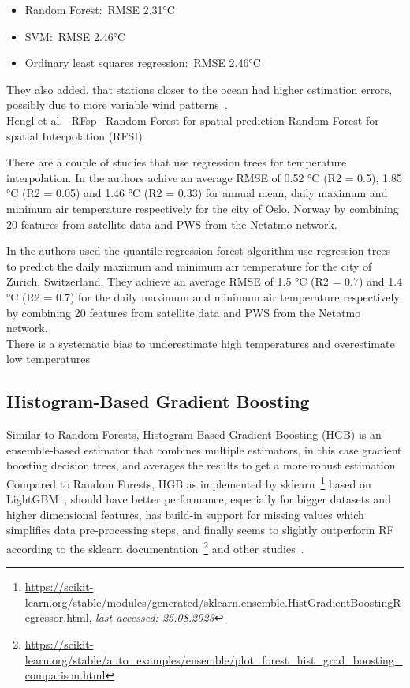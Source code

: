 \begin{itemize}
    \item Random Forest:\ RMSE 2.31°C
    \item SVM:\ RMSE 2.46°C
    \item Ordinary least squares regression:\ RMSE 2.46°C
\end{itemize}

They also added, that stations closer to the ocean had higher estimation errors, possibly due to more variable wind patterns~\cite{runnalls2000dynamics}.\\
Hengl et al.~\cite{hengl2018random}
RFsp~\cite{hengl2018random} Random Forest for spatial prediction
Random Forest for spatial Interpolation (RFSI)~\cite{sekulic2020random}

There are a couple of studies that use regression trees for temperature interpolation. In \cite{venter2020hyperlocal} the authors achive an average RMSE of 0.52 °C (R2 = 0.5), 1.85 °C (R2 = 0.05) and 1.46 °C (R2 = 0.33) for annual mean, daily maximum and minimum air temperature respectively for the city of Oslo, Norway by combining 20 features from satellite data and PWS from the Netatmo network.

In \cite{zumwald2021mapping} the authors used the quantile regression forest algorithm
use regression trees to predict the daily maximum and minimum air temperature for the city of Zurich, Switzerland. They achieve an average RMSE of 1.5 °C (R2 = 0.7) and 1.4 °C (R2 = 0.7) for the daily maximum and minimum air temperature respectively by combining 20 features from satellite data and PWS from the Netatmo network.\\

There is a systematic bias to underestimate high temperatures and overestimate low temperatures~\cite{zumwald2021mapping, zhang2012bias}

\subsection{Histogram-Based Gradient Boosting}

Similar to Random Forests, Histogram-Based Gradient Boosting (HGB) is an ensemble-based estimator that combines multiple estimators, in this case gradient boosting decision trees, and averages the results to get a more robust estimation. Compared to Random Forests, HGB as implemented by sklearn~\footnote{\url{https://scikit-learn.org/stable/modules/generated/sklearn.ensemble.HistGradientBoostingRegressor.html}, \textit{last accessed: 25.08.2023}} based on LightGBM~\cite{ke2017lightgbm}, should have better performance, especially for bigger datasets and higher dimensional features, has build-in support for missing values which simplifies data pre-processing steps, and finally seems to slightly outperform RF according to the sklearn documentation~\footnote{\url{https://scikit-learn.org/stable/auto\_examples/ensemble/plot\_forest\_hist\_grad\_boosting\_comparison.html}} and other studies~\cite{apaydin2022evaluation}.

